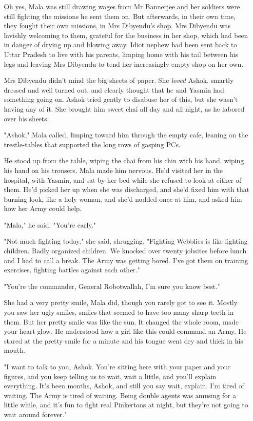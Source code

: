 Oh yes, Mala was still drawing wages from Mr Bannerjee and her
soldiers were still fighting the missions he sent them on. But
afterwards, in their own time, they fought their own missions, in
Mrs Dibyendu's shop. Mrs Dibyendu was lavishly welcoming to them,
grateful for the business in her shop, which had been in danger of
drying up and blowing away. Idiot nephew had been sent back to
Uttar Pradesh to live with his parents, limping home with his tail
between his legs and leaving Mrs Dibyendu to tend her increasingly
empty shop on her own.

Mrs Dibyendu didn't mind the big sheets of paper. She \emph{loved}
Ashok, smartly dressed and well turned out, and clearly thought
that he and Yasmin had something going on. Ashok tried gently to
disabuse her of this, but she wasn't having any of it. She brought
him sweet chai all day and all night, as he labored over his
sheets.

"Ashok," Mala called, limping toward him through the empty cafe,
leaning on the trestle-tables that supported the long rows of
gasping PCs.

He stood up from the table, wiping the chai from his chin with his
hand, wiping his hand on his trousers. Mala made him nervous. He'd
visited her in the hospital, with Yasmin, and sat by her bed while
she refused to look at either of them. He'd picked her up when she
was discharged, and she'd fixed him with that burning look, like a
holy woman, and she'd nodded once at him, and asked him how her
Army could help.

"Mala," he said. "You're early."

"Not much fighting today," she said, shrugging. "Fighting Webblies
is like fighting children. Badly organized children. We knocked
over twenty jobsites before lunch and I had to call a break. The
Army was getting bored. I've got them on training exercises,
fighting battles against each other."

"You're the commander, General Robotwallah, I'm sure you know
best."

She had a very pretty smile, Mala did, though you rarely got to see
it. Mostly you saw her ugly smiles, smiles that seemed to have too
many sharp teeth in them. But her pretty smile was like the sun. It
changed the whole room, made your heart glow. He understood how a
girl like this could command an Army. He stared at the pretty smile
for a minute and his tongue went dry and thick in his mouth.

"I want to talk to you, Ashok. You're sitting here with your paper
and your figures, and you keep telling us to wait, wait a little,
and you'll explain everything. It's been months, Ashok, and still
you say wait, explain. I'm tired of waiting. The Army is tired of
waiting. Being double agents was amusing for a little while, and
it's fun to fight real Pinkertons at night, but they're not going
to wait around forever."

